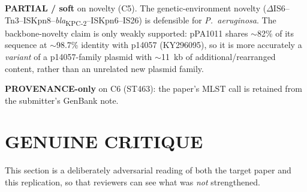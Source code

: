 \documentclass[11pt]{article}
\begin{document}
\textbf{PARTIAL / soft} on novelty (C5). The genetic-environment novelty ($\Delta$IS6--Tn3--ISKpn8--\textit{bla}\textsubscript{KPC-2}--ISKpn6--IS26) is defensible for \textit{P.~aeruginosa}. The backbone-novelty claim is only weakly supported: pPA1011 shares $\sim$82\% of its sequence at $\sim$98.7\% identity with p14057 (KY296095), so it is more accurately a \emph{variant} of a p14057-family plasmid with $\sim$11~kb of additional/rearranged content, rather than an unrelated new plasmid family.

\textbf{PROVENANCE-only} on C6 (ST463): the paper's MLST call is retained from the submitter's GenBank note.

\section{GENUINE CRITIQUE}
This section is a deliberately adversarial reading of both the target paper and this replication, so that reviewers can see what was \emph{not} strengthened.
\end{document}
